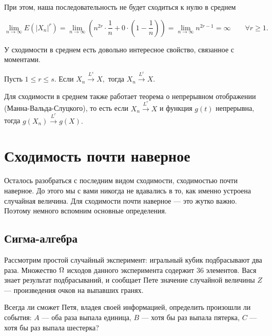 \documentclass[12pt, a4paper, oneside]{article}
\begin{document}
При этом, наша последовательность не будет сходиться к нулю в среднем

$$
\lim_{n \to \infty} E(|X_n|^r) = \lim_{n \to \infty} (n^{2r} \cdot \frac{1}{n} + 0 \cdot (1- \frac{1}{n})) = \lim_{n \to \infty} n^{2r - 1} = \infty \qquad \forall r \ge 1.
$$

У сходимости в среднем есть довольно интересное свойство, связанное с моментами.

\begin{proposition}
Пусть $1 \le r \le s$. Если $X_n \overset{L^s}{\to} X,$ тогда $X_n \overset{L^r}{\to} X$.
\end{proposition}






Для сходимости в среднем также работает теорема о непрерывном отображении (Манна-Вальда-Слуцкого), то есть если $X_n \overset{L^r}{\to} X$ и функция $g(t)$ непрерывна, тогда $g(X_n) \overset{L^r}{\to} g(X).$



\section{Сходимость почти наверное} 

Осталось разобраться с последним видом сходимости, сходимостью почти наверное. До этого мы с вами никогда не вдавались в то, как именно устроена случайная величина. Для сходимости почти наверное --- это жутко важно. Поэтому немного вспомним основные определения. 

\subsection{Сигма-алгебра} 

\begin{problem}{}
Рассмотрим простой случайный эксперимент: игральный кубик подбрасывают два раза. Множество $\Omega$ исходов данного эксперимента содержит $36$ элементов. Вася знает результат подбрасываний, и сообщает Пете значение случайной величины $Z$ --- произведения очков на выпавших гранях.

Всегда ли сможет Петя, владея своей информацией, определить произошли ли события: $A$ --- оба раза выпала единица, $B$ --- хотя бы раз выпала пятерка, $C$ --- хотя бы раз выпала шестерка?
\end{problem} 
\end{document}
